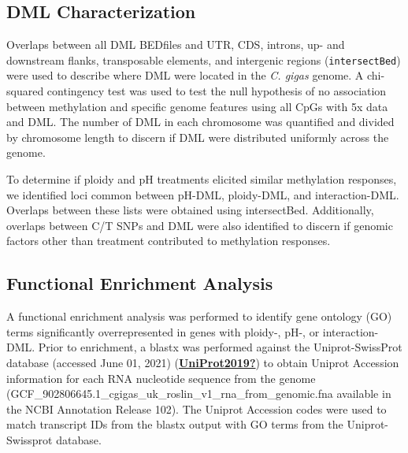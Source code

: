 \documentclass [11pt, proquest] {uwthesis}[2015/03/03]
\begin{document}
\hypertarget{dml-characterization-2}{%
\subsection{DML Characterization}\label{dml-characterization-2}}

Overlaps between all DML BEDfiles and UTR, CDS, introns, up- and downstream flanks, transposable elements, and intergenic regions (\texttt{intersectBed}) were used to describe where DML were located in the \emph{C. gigas} genome. A chi-squared contingency test was used to test the null hypothesis of no association between methylation and specific genome features using all CpGs with 5x data and DML. The number of DML in each chromosome was quantified and divided by chromosome length to discern if DML were distributed uniformly across the genome.

To determine if ploidy and pH treatments elicited similar methylation responses, we identified loci common between pH-DML, ploidy-DML, and interaction-DML. Overlaps between these lists were obtained using intersectBed. Additionally, overlaps between C/T SNPs and DML were also identified to discern if genomic factors other than treatment contributed to methylation responses.

\hypertarget{functional-enrichment-analysis}{%
\subsection{Functional Enrichment Analysis}\label{functional-enrichment-analysis}}

A functional enrichment analysis was performed to identify gene ontology (GO) terms significantly overrepresented in genes with ploidy-, pH-, or interaction-DML. Prior to enrichment, a blastx was performed against the Uniprot-SwissProt database (accessed June 01, 2021) (\protect\hyperlink{ref-UniProt2019}{\textbf{UniProt2019?}}) to obtain Uniprot Accession information for each RNA nucleotide sequence from the genome (GCF\_902806645.1\_cgigas\_uk\_roslin\_v1\_rna\_from\_genomic.fna available in the NCBI Annotation Release 102). The Uniprot Accession codes were used to match transcript IDs from the blastx output with GO terms from the Uniprot-Swissprot database.
\end{document}
